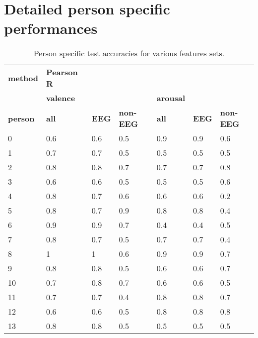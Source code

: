 \chapter{Detailed \textbf{person} specific performances}
\begin{table}[]
\centering
\caption{Person specific test accuracies for various features sets.}
\begin{tabular}{l|lll|lll}
\textbf{\textbf{method}} & \textbf{Pearson R}   & 	 &         &         &     &         \\
                & \textbf{valence}              &           &         & \textbf{arousal} &     &         \\
\textbf{person}          & \textbf{all}                  & \textbf{EEG}       & \textbf{non-EEG} & \textbf{all}     & \textbf{EEG} & \textbf{non-EEG} \\ \hline 
 0               & 0.6                  & 0.6       & 0.5     & 0.9     & 0.9 & 0.6     \\
1               & 0.7                  & 0.7       & 0.5     & 0.5     & 0.5 & 0.5     \\
2               & 0.8                  & 0.8       & 0.7     & 0.7     & 0.7 & 0.8     \\
3               & 0.6                  & 0.6       & 0.5     & 0.5     & 0.5 & 0.6     \\
4               & 0.8                  & 0.7       & 0.6     & 0.6     & 0.6 & 0.2     \\
5               & 0.8                  & 0.7       & 0.9     & 0.8     & 0.8 & 0.4     \\
6               & 0.9                  & 0.9       & 0.7     & 0.4     & 0.4 & 0.5     \\
7               & 0.8                  & 0.7       & 0.5     & 0.7     & 0.7 & 0.4     \\
8               & 1                    & 1         & 0.6     & 0.9     & 0.9 & 0.7     \\
9               & 0.8                  & 0.8       & 0.5     & 0.6     & 0.6 & 0.7     \\
10              & 0.7                  & 0.8       & 0.7     & 0.6     & 0.6 & 0.5     \\
11              & 0.7                  & 0.7       & 0.4     & 0.8     & 0.8 & 0.7     \\
12              & 0.6                  & 0.6       & 0.5     & 0.8     & 0.8 & 0.8     \\
13              & 0.8                  & 0.8       & 0.5     & 0.5     & 0.5 & 0.5     \\

\end{tabular}
\end{table}
